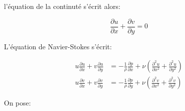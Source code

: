 \documentclass[french]{article}
\begin{document}
l'équation de la continuté s'écrit alors:

\begin{equation}
\label{Eq:1}
\frac{\partial u}{\partial x} + \frac{\partial v}{\partial y} = 0
\end{equation}


L'équation de Navier-Stokes s'écrit:

\begin{align}%
	u\frac{\partial u}{\partial x} + 
	v\frac{\partial u}{\partial y} 
	&= - \frac{1}{\rho}
	\frac{\partial p}{\partial  x} +
	\nu\left (\frac{\partial^{2} u}{\partial  x^{2}} + 
	\frac{\partial^{2} u}{\partial  y^{2}}\right ) \\
	u\frac{\partial v}{\partial x} + 
	v\frac{\partial v}{\partial y} 
	&= - \frac{1}{\rho}
	\frac{\partial p}{\partial  y} +
	\nu\left (\frac{\partial^{2} v}{\partial  x^{2}} + 
	\frac{\partial^{2} v}{\partial  y^{2}}\right ) 
\end{align}

On pose:
\end{document}
